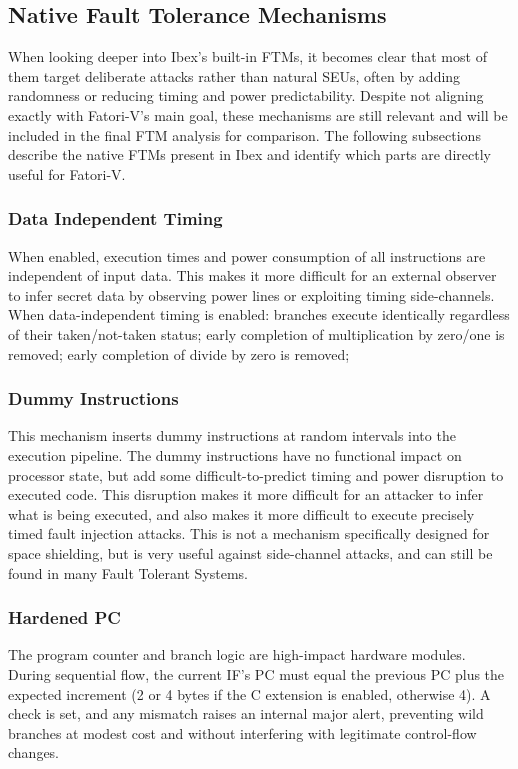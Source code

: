 \subsection{Native Fault Tolerance Mechanisms}
\label{chap5:ibex_ftm}

When looking deeper into Ibex’s built-in \acp{FTM}, it becomes clear that most of them target deliberate attacks rather than natural \acp{SEU}, often by adding randomness or reducing timing and power predictability. Despite not aligning exactly with \ac{Fatori-V}'s main goal, these mechanisms are still relevant and will be included in the final \ac{FTM} analysis for comparison. The following subsections describe the native \acp{FTM} present in Ibex and identify which parts are directly useful for \ac{Fatori-V}.

\subsubsection{Data Independent Timing}
When enabled, execution times and power consumption of all instructions are independent of input data. This makes it more difficult for an external observer to infer secret data by observing power lines or exploiting timing side-channels.\\
When data-independent timing is enabled: branches execute identically regardless of their taken/not-taken status; early completion of multiplication by zero/one is removed; early completion of divide by zero is removed;

\subsubsection{Dummy Instructions}
 This mechanism inserts dummy instructions at random intervals into the execution pipeline. The dummy instructions have no functional impact on processor state, but add some difficult-to-predict timing and power disruption to executed code. This disruption makes it more difficult for an attacker to infer what is being executed, and also makes it more difficult to execute precisely timed fault injection attacks. This is not a mechanism specifically designed for space shielding, but is very useful against side-channel attacks, and can still be found in many Fault Tolerant Systems.

\subsubsection{Hardened PC}
 The program counter and branch logic are high-impact hardware modules. During sequential flow, the current \ac{IF}'s \ac{PC} must equal the previous \ac{PC} plus the expected increment (2 or 4 bytes if the C extension is enabled, otherwise 4). A check is set, and any mismatch raises an internal major alert, preventing wild branches at modest cost and without interfering with legitimate control-flow changes.

